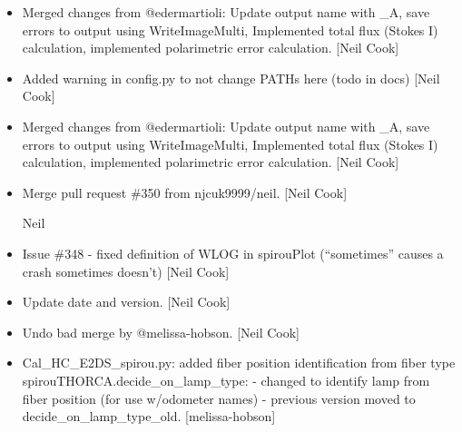 \documentclass[a4paper,10pt,english]{report}
\begin{document}
\begin{itemize}
\item {} 
Merged changes from @edermartioli: Update output name with \_A, save
errors to output using WriteImageMulti, Implemented total flux (Stokes
I) calculation, implemented polarimetric error calculation. {[}Neil
Cook{]}

\item {} 
Added warning in config.py to not change PATHs here (todo in docs)
{[}Neil Cook{]}

\item {} 
Merged changes from @edermartioli: Update output name with \_A, save
errors to output using WriteImageMulti, Implemented total flux (Stokes
I) calculation, implemented polarimetric error calculation. {[}Neil
Cook{]}

\item {} 
Merge pull request \#350 from njcuk9999/neil. {[}Neil Cook{]}

Neil

\item {} 
Issue \#348 - fixed definition of WLOG in spirouPlot (“sometimes”
causes a crash sometimes doesn’t) {[}Neil Cook{]}

\item {} 
Update date and version. {[}Neil Cook{]}

\item {} 
Undo bad merge by @melissa-hobson. {[}Neil Cook{]}

\item {} 
Cal\_HC\_E2DS\_spirou.py: added fiber position identification from fiber
type spirouTHORCA.decide\_on\_lamp\_type: - changed to identify lamp from
fiber position (for use w/odometer names) - previous version moved to
decide\_on\_lamp\_type\_old. {[}melissa-hobson{]}

\end{itemize}
\end{document}
